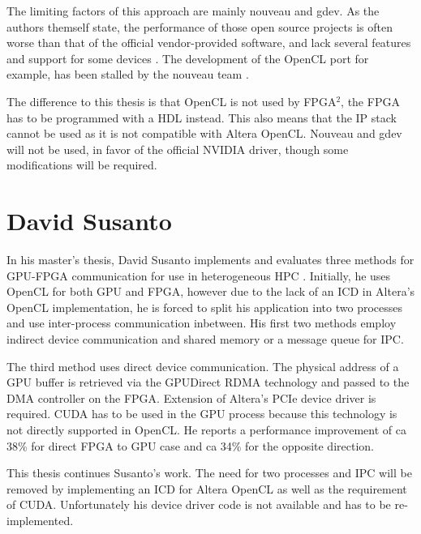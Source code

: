 The limiting factors of this approach are mainly nouveau and gdev.
As the authors themself state, the performance of those open source projects is often worse than that of the official vendor-provided software, and lack several features and support for some devices \cite{fpga2}.
The development of the OpenCL port for example, has been stalled by the nouveau team \cite{nouveau_featurematrix}.

The difference to this thesis is that OpenCL is not used by FPGA$^2$, the FPGA has to be programmed with a HDL instead.
This also means that the IP stack cannot be used as it is not compatible with Altera OpenCL.
Nouveau and gdev will not be used, in favor of the official NVIDIA driver, though some modifications will be required.







\section{David Susanto}

In his master's thesis, David Susanto implements and evaluates three methods for GPU-FPGA communication for use in heterogeneous HPC \cite{susanto}.
Initially, he uses OpenCL for both GPU and FPGA, however due to the lack of an ICD in Altera's OpenCL implementation, he is forced to split his application into two processes and use inter-process communication inbetween.
His first two methods employ indirect device communication and shared memory or a message queue for IPC.

The third method uses direct device communication.
The physical address of a GPU buffer is retrieved via the GPUDirect RDMA technology and passed to the DMA controller on the FPGA.
Extension of Altera's PCIe device driver is required.
CUDA has to be used in the GPU process because this technology is not directly supported in OpenCL.
He reports a performance improvement of ca 38\% for direct FPGA to GPU case and ca 34\% for the opposite direction.



This thesis continues Susanto's work.
The need for two processes and IPC will be removed by implementing an ICD for Altera OpenCL as well as the requirement of CUDA.
Unfortunately his device driver code is not available and has to be re-implemented.

